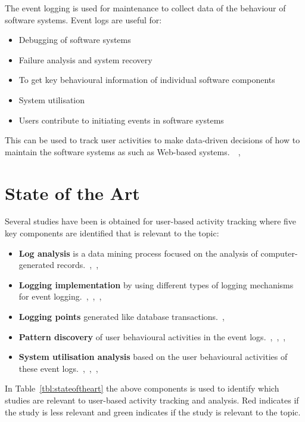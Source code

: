 The event logging is used for maintenance to collect data of the behaviour of software systems. Event logs are useful for:~\cite{Park2017}
\begin{itemize}
    \item Debugging of software systems
    \item Failure analysis and system recovery
    \item To get key behavioural information of individual software components
    \item System utilisation
    \item Users contribute to initiating events in software systems
\end{itemize}
This can be used to track user activities to make data-driven decisions of how to maintain the software systems as such as Web-based systems.~\cite{Rong2018}~\cite{Razavi2008},~\cite{Lei2018}

\newpage
\section{State of the Art}\label{sec:stateofart}

Several studies have been is obtained for user-based activity tracking where five key components are identified that is relevant to the topic:

\begin{itemize}
    \item \textbf{Log analysis} is a data mining process focused on the analysis of computer-generated records.~\cite{Vaarandi2015},~\cite{Pecchia2015},~\cite{Song2008}
    \item \textbf{Logging implementation} by using different types of logging mechanisms for event logging.~\cite{Potey2013},~\cite{Rong2018},~\cite{Rong2018a},~\cite{Tian2017}
    \item \textbf{Logging points} generated like database transactions.~\cite{Potey2013},~\cite{Li2018}
    \item \textbf{Pattern discovery} of user behavioural activities in the event logs.~\cite{Dhanalakshmi2016},~\cite{Slaninova2014},~\cite{Lu2019},~\cite{Port2017}
    \item \textbf{System utilisation analysis} based on the user behavioural activities of these event logs.~\cite{Park2017},~\cite{Slaninova2014},~\cite{Lu2019},~\cite{Chen2019}
\end{itemize}

In Table~\ref{tbl:stateoftheart} the above components is used to identify which studies are relevant to user-based activity tracking and analysis. Red indicates if the study is less relevant and green indicates if the study is relevant to the topic.


